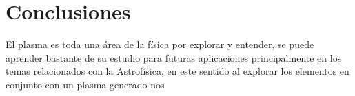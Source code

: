 \documentclass[12pt]{IEEEtran}
\begin{document}
\section{Conclusiones}
El plasma es toda una área de la física por explorar y entender, se puede aprender bastante de su estudio para futuras aplicaciones principalmente en los temas relacionados con la Astrofísica, en este sentido al explorar los elementos en conjunto con un plasma generado nos



\nocite{*}
\printbibliography
\end{document}

